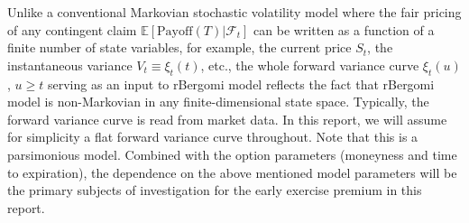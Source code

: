 \documentclass[12pt]{article}
\numberwithin{equation}{section}
\begin{document}
Unlike a conventional Markovian stochastic volatility model where the fair pricing of any contingent claim $\mathbb{E}[\text{Payoff}(T)|\mathcal{F}_t]$ can be written as a function of a finite number of state variables, for example, the current price $S_t$, the instantaneous variance $V_t \equiv \xi_t(t)$, etc., the whole forward variance curve $\xi_t(u)$, $u\ge t$ serving as an input to rBergomi model reflects the fact that rBergomi model is non-Markovian in any finite-dimensional state space. Typically, the forward variance curve is read from market data. In this report, we will assume for simplicity a flat forward variance curve throughout. Note that this is a parsimonious model. Combined with the option parameters (moneyness and time to expiration), the dependence on the above mentioned model parameters will be the primary subjects of investigation for the early exercise premium in this report.
\end{document}
